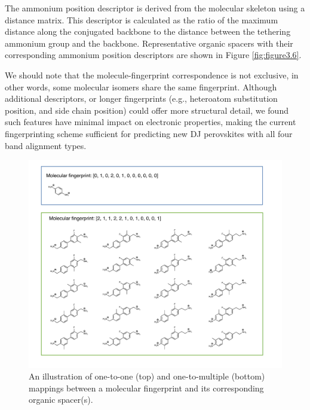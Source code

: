 The ammonium position descriptor is derived from the molecular skeleton using a distance matrix. This descriptor is calculated as the ratio of the maximum distance along the conjugated backbone to the distance between the tethering ammonium group and the backbone. Representative organic spacers with their corresponding ammonium position descriptors are shown in Figure \ref{fig:figure3.6}.

We should note that the molecule-fingerprint correspondence is not exclusive, in other words, some molecular isomers share the same fingerprint. Although additional descriptors, or longer fingerprints (e.g., heteroatom substitution position, and side chain position) could offer more structural detail, we found such features have minimal impact on electronic properties, making the current fingerprinting scheme sufficient for predicting new DJ perovskites with all four band alignment types.

\begin{figure}[ht]
    \centering
    \includegraphics[width=\textwidth]{figures/methodology/figure3-7.pdf}
    \caption{An illustration of one-to-one (top) and one-to-multiple (bottom) mappings between a molecular fingerprint and its corresponding organic spacer(s).}
    \label{fig:figure3.7}
\end{figure}

